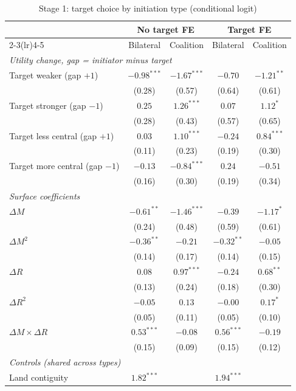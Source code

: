\documentclass[11pt]{article}
\begin{document}
\begin{table}[!htbp]\centering\small
\caption{Stage 1: target choice by initiation type (conditional logit)}\label{tab:stage1}
\begin{tabular}{lcccc}
\toprule
 & \multicolumn{2}{c}{No target FE} & \multicolumn{2}{c}{Target FE} \\
\cmidrule(lr){2-3}\cmidrule(lr){4-5}
 & Bilateral & Coalition & Bilateral & Coalition \\
\midrule
\multicolumn{5}{l}{\emph{Utility change, gap = initiator minus target}} \\
Target weaker (gap $+1$) & $-0.98^{***}$ & $-1.67^{***}$ & $-0.70$ & $-1.21^{**}$ \\
 & (0.28) & (0.57) & (0.64) & (0.61) \\
Target stronger (gap $-1$) & $0.25$ & $1.26^{***}$ & $0.07$ & $1.12^{*}$ \\
 & (0.28) & (0.43) & (0.57) & (0.65) \\
Target less central (gap $+1$) & $0.03$ & $1.10^{***}$ & $-0.24$ & $0.84^{***}$ \\
 & (0.11) & (0.23) & (0.19) & (0.30) \\
Target more central (gap $-1$) & $-0.13$ & $-0.84^{***}$ & $0.24$ & $-0.51$ \\
 & (0.16) & (0.30) & (0.19) & (0.34) \\
\midrule
\multicolumn{5}{l}{\emph{Surface coefficients}} \\
$\Delta M$ & $-0.61^{**}$ & $-1.46^{***}$ & $-0.39$ & $-1.17^{*}$ \\
 & (0.24) & (0.48) & (0.59) & (0.61) \\
$\Delta M^2$ & $-0.36^{**}$ & $-0.21$ & $-0.32^{**}$ & $-0.05$ \\
 & (0.14) & (0.17) & (0.14) & (0.15) \\
$\Delta R$ & $0.08$ & $0.97^{***}$ & $-0.24$ & $0.68^{**}$ \\
 & (0.13) & (0.24) & (0.18) & (0.30) \\
$\Delta R^2$ & $-0.05$ & $0.13$ & $-0.00$ & $0.17^{*}$ \\
 & (0.05) & (0.11) & (0.05) & (0.10) \\
$\Delta M \times \Delta R$ & $0.53^{***}$ & $-0.08$ & $0.56^{***}$ & $-0.19$ \\
 & (0.15) & (0.09) & (0.15) & (0.12) \\
\midrule
\multicolumn{5}{l}{\emph{Controls (shared across types)}} \\
Land contiguity & $1.82^{***}$ &  & $1.94^{***}$ &  \\

\end{tabular}
\end{table}
\end{document}
